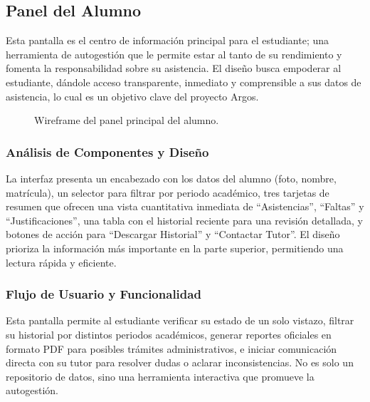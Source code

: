 \subsection{ Panel del Alumno}
\begin{samepage}\small
Esta pantalla es el centro de información principal para el estudiante; una herramienta de autogestión que le permite estar al tanto de su rendimiento y fomenta la responsabilidad sobre su asistencia. El diseño busca empoderar al estudiante, dándole acceso transparente, inmediato y comprensible a sus datos de asistencia, lo cual es un objetivo clave del proyecto Argos.
\begin{figure}[H]\centering
    \caption{Wireframe del panel principal del alumno.}\label{fig:wf-student-panel}
\end{figure}
    \subsubsection*{Análisis de Componentes y Diseño}
    La interfaz presenta un encabezado con los datos del alumno (foto, nombre, matrícula), un selector para filtrar por periodo académico, tres tarjetas de resumen que ofrecen una vista cuantitativa inmediata de ``Asistencias'', ``Faltas'' y ``Justificaciones'', una tabla con el historial reciente para una revisión detallada, y botones de acción para ``Descargar Historial'' y ``Contactar Tutor''. El diseño prioriza la información más importante en la parte superior, permitiendo una lectura rápida y eficiente.
    
    \subsubsection*{Flujo de Usuario y Funcionalidad}
    Esta pantalla permite al estudiante verificar su estado de un solo vistazo, filtrar su historial por distintos periodos académicos, generar reportes oficiales en formato PDF para posibles trámites administrativos, e iniciar comunicación directa con su tutor para resolver dudas o aclarar inconsistencias. No es solo un repositorio de datos, sino una herramienta interactiva que promueve la autogestión.
\normalsize\end{samepage}
\clearpage

